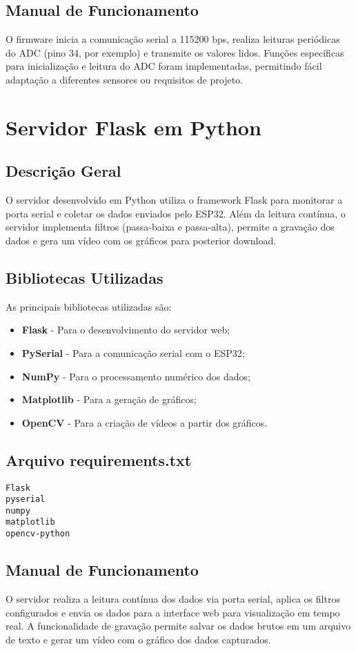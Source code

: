 \documentclass[12pt,a4paper]{article}
\begin{document}
\subsection{Manual de Funcionamento}
O firmware inicia a comunicação serial a 115200 bps, realiza leituras periódicas do ADC (pino 34, por exemplo) e transmite os valores lidos. Funções específicas para inicialização e leitura do ADC foram implementadas, permitindo fácil adaptação a diferentes sensores ou requisitos de projeto.

\section{Servidor Flask em Python}
\subsection{Descrição Geral}
O servidor desenvolvido em Python utiliza o framework Flask para monitorar a porta serial e coletar os dados enviados pelo ESP32. Além da leitura contínua, o servidor implementa filtros (passa-baixa e passa-alta), permite a gravação dos dados e gera um vídeo com os gráficos para posterior download.

\subsection{Bibliotecas Utilizadas}
As principais bibliotecas utilizadas são:
\begin{itemize}
    \item \textbf{Flask} - Para o desenvolvimento do servidor web;
    \item \textbf{PySerial} - Para a comunicação serial com o ESP32;
    \item \textbf{NumPy} - Para o processamento numérico dos dados;
    \item \textbf{Matplotlib} - Para a geração de gráficos;
    \item \textbf{OpenCV} - Para a criação de vídeos a partir dos gráficos.
\end{itemize}

\subsection{Arquivo requirements.txt}
\begin{verbatim}
Flask
pyserial
numpy
matplotlib
opencv-python
\end{verbatim}

\subsection{Manual de Funcionamento}
O servidor realiza a leitura contínua dos dados via porta serial, aplica os filtros configurados e envia os dados para a interface web para visualização em tempo real. A funcionalidade de gravação permite salvar os dados brutos em um arquivo de texto e gerar um vídeo com o gráfico dos dados capturados.
\end{document}
